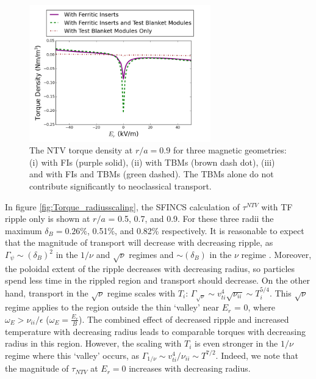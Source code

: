 \documentclass{article}
\begin{document}
\begin{figure}[h!]
\centering
\includegraphics[width=0.7\textwidth]{Torque_comparingTBMandFI.png}
\caption{\label{fig:Torque_comparingTBMandFI} The NTV torque density at $r/a = 0.9$ for three magnetic geometries: (i) with FIs (purple solid), (ii) with TBMs (brown dash dot), (iii) and with FIs and TBMs (green dashed). The TBMs alone do not contribute significantly to neoclassical transport. }
\end{figure}

In figure \ref{fig:Torque_radiusscaling}, the SFINCS calculation of $\tau^{NTV}$ with TF ripple only is shown at $r/a$ = 0.5, 0.7, and 0.9. For these three radii the maximum $\delta_B = 0.26\%$, 0.51\%, and 0.82\% respectively. It is reasonable to expect that the magnitude of transport will decrease with decreasing ripple, as $\Gamma_{\psi} \sim (\delta_B)^2$ in the $1/\nu$ and $\sqrt{\nu}$ regimes and $\sim (\delta_B)$ in the $\nu$ regime \cite{Shaing2010}.  Moreover, the poloidal extent of the ripple decreases with decreasing radius, so particles spend less time in the rippled region and transport should decrease. On the other hand, transport in the $\sqrt{\nu}$ regime scales with $T_i$: $\Gamma_{\sqrt{\nu}} \sim v_{ti}^4 \sqrt{\nu_{ii}} \sim T_i^{5/4}$. This $\sqrt{\nu}$ regime applies to the region outside the thin `valley' near $E_r$ = 0, where $\omega_E > \nu_{ii}/\epsilon$ ($\omega_E = \frac{E_r}{B}$). The combined effect of decreased ripple and increased temperature with decreasing radius leads to comparable torques with decreasing radius in this region. However, the scaling with $T_i$ is even stronger in the $1/\nu$ regime where this `valley' occurs, as $\Gamma_{1/\nu} \sim v_{ti}^4/\nu_{ii} \sim T^{7/2}$. Indeed, we note that the magnitude of $\tau_{NTV}$ at $E_r = 0$ increases with decreasing radius. 
\end{document}

